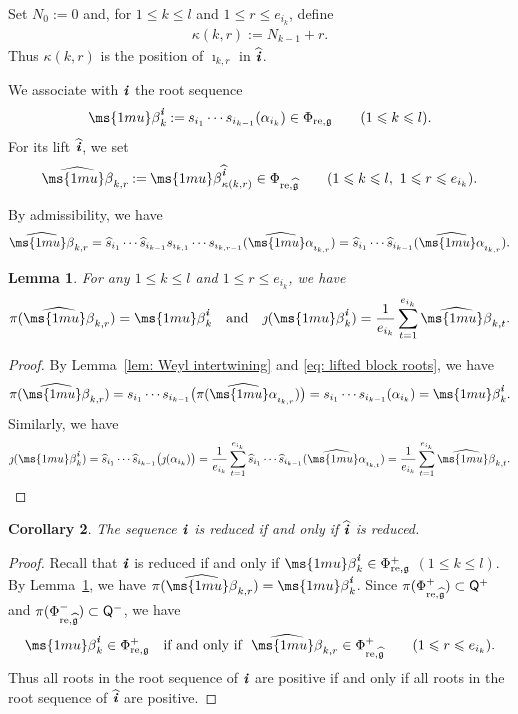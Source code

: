 \documentclass[12pt, leqno]{amsart}
\numberwithin{equation}{section}
\theoremstyle{plain}
\newtheorem{lemma}{Lemma}[section]
\newtheorem{corollary}[lemma]{Corollary}
\theoremstyle{definition}
\renewcommand{\le}{\leqslant}
\newcommand{\seteq}{\mathbin{:=}}
\newcommand{\g}{\mathfrak{g}}
\newcommand{\al}{{\ms{1mu}\alpha}}
\newcommand{\be}{{\ms{1mu}\beta}}
\newcommand{\re}{{\rm re}}
\newcommand{\im}{\imath}
\newcommand{\jm}{\jmath}
\newcommand{\ii}{ \textbf{\textit{i}}}
\newcommand{\hg}{{\widehat{\g}}}
\newcommand{\hs}{\widehat{s}}
\newcommand{\hal}{\widehat{\al}}
\newcommand{\hbe}{\widehat{\be}}
\newcommand{\hii}{{\widehat{\ii}}}
\newcommand{\sfQ}{\mathsf{Q}}
\newcommand{\qtq}[1][{and}]{\quad\text{{#1}}\quad}
\begin{document}
Set $N_0\seteq0$ and, for $1\le k\le l$ and $1\le r\le e_{i_k}$, define
\begin{align} \label{eq: kappa k,r}
\kappa(k,r)\seteq N_{k-1}+r.
\end{align}
Thus $\kappa(k,r)$ is the position of $\im_{k,r}$ in $\hii$.

We associate with $\ii$ the root sequence
\[
\be_k^\ii \seteq s_{i_1}\cdots s_{i_{k-1}}(\alpha_{i_k}) \in \Phi_{\re,\g} \qquad(1\le k\le l).
\]
For its lift $\hii$, we set
\[
\hbe_{k,r} \seteq \be_{\kappa(k,r)}^{\hii} \in\Phi_{\re,\hg} \qquad (1\le k\le l,\ 1\le r\le e_{i_k}).
\]

By admissibility, we have
\begin{align} \label{eq: lifted block roots}
\hbe_{k,r}
= \hs_{i_1}\cdots\hs_{i_{k-1}} s_{\im_{k,1}}\cdots s_{\im_{k,r-1}} (\hal_{\im_{k,r}})
= \hs_{i_1}\cdots\hs_{i_{k-1}} (\hal_{\im_{k,r}}).
\end{align}

\begin{lemma}\label{lem: root folding}
For any $1\le k\le l$ and $1\le r\le e_{i_k}$, we have
\[
\pi(\hbe_{k,r})=\be_k^\ii \qtq \jm(\be_k^\ii) = \frac{1}{e_{i_k}} \sum_{t=1}^{e_{i_k}}\hbe_{k,t}.
\]
\end{lemma}

\begin{proof}
By Lemma~\ref{lem: Weyl intertwining} and \eqref{eq: lifted block roots}, we have
\[
\pi(\hbe_{k,r}) = s_{i_1}\cdots s_{i_{k-1}} \bigl(\pi(\hal_{\im_{k,r}})\bigr) = s_{i_1}\cdots s_{i_{k-1}}(\alpha_{i_k})
= \be_k^\ii.
\]
Similarly, we have
\[
\jm(\be_k^\ii) = \hs_{i_1}\cdots\hs_{i_{k-1}} \bigl(\jm(\alpha_{i_k})\bigr)
= \dfrac{1}{e_{i_k}} \sum_{t=1}^{e_{i_k}} \hs_{i_1}\cdots\hs_{i_{k-1}} (\hal_{\im_{k,t}})
= \dfrac{1}{e_{i_k}} \sum_{t=1}^{e_{i_k}}\hbe_{k,t}.
\qedhere
\]
\end{proof}

\begin{corollary}\label{cor: reduced lift}
The sequence $\ii$ is reduced if and only if $\hii$ is reduced.
\end{corollary}

\begin{proof}
Recall that $\ii$ is reduced if and only if $\be_k^\ii\in\Phi_{\re,\g}^+$ $(1\le k\le l)$.
By Lemma~\ref{lem: root folding}, we have $\pi(\hbe_{k,r})=\be_k^\ii$.
Since $\pi(\Phi_{\re,\hg}^+)\subset\sfQ^+$ and $\pi(\Phi_{\re,\hg}^-)\subset\sfQ^-$, we have
\[
\be_k^\ii\in\Phi_{\re,\g}^+ \ \ \text{ if and only if} \ \ \hbe_{k,r}\in\Phi_{\re,\hg}^+ \qquad(1\le r\le e_{i_k}).
\]
Thus all roots in the root sequence of $\ii$ are positive if and only if
all roots in the root sequence of $\hii$ are positive.
\end{proof}
\end{document}
